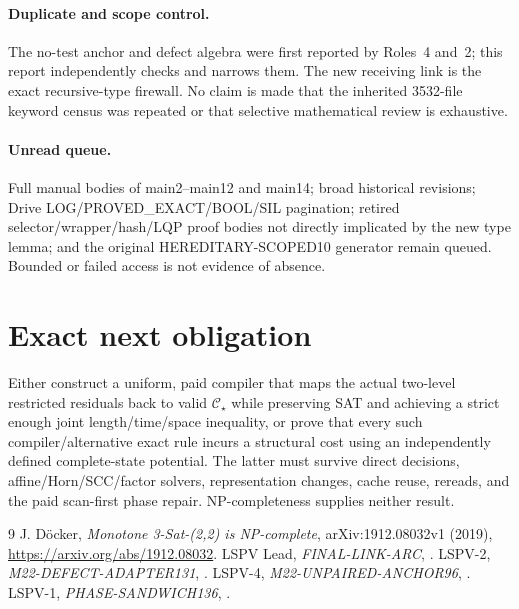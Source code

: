 \documentclass[11pt]{article}
\newcommand{\Cstar}{\mathcal C_\star}
\begin{document}
\paragraph{Duplicate and scope control.}
The no-test anchor and defect algebra were first reported by Roles~4 and~2;
this report independently checks and narrows them.  The new receiving link is
the exact recursive-type firewall.  No claim is made that the inherited
3532-file keyword census was repeated or that selective mathematical review is
exhaustive.

\paragraph{Unread queue.}
Full manual bodies of main2--main12 and main14; broad historical revisions;
Drive LOG/PROVED\_EXACT/BOOL/SIL pagination; retired selector/wrapper/hash/LQP
proof bodies not directly implicated by the new type lemma; and the original
HEREDITARY-SCOPED10 generator remain queued.  Bounded or failed access is not
evidence of absence.

\section{Exact next obligation}
Either construct a uniform, paid compiler that maps the actual two-level
restricted residuals back to valid $\Cstar$ while preserving SAT and achieving
a strict enough joint length/time/space inequality, or prove that every such
compiler/alternative exact rule incurs a structural cost using an independently
defined complete-state potential.  The latter must survive direct decisions,
affine/Horn/SCC/factor solvers, representation changes, cache reuse, rereads,
and the paid scan-first phase repair.  NP-completeness supplies neither result.

\begin{thebibliography}{9}\small
{} J. Döcker, \emph{Monotone 3-Sat-(2,2) is NP-complete},
arXiv:1912.08032v1 (2019), \url{https://arxiv.org/abs/1912.08032}.
 LSPV Lead, \emph{FINAL-LINK-ARC},
.
 LSPV-2, \emph{M22-DEFECT-ADAPTER131},
.
 LSPV-4, \emph{M22-UNPAIRED-ANCHOR96},
.
 LSPV-1, \emph{PHASE-SANDWICH136},
.
\end{thebibliography}
\end{document}
